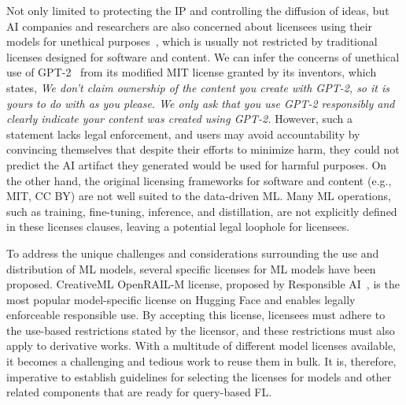 Not only limited to protecting the IP and controlling the diffusion of ideas, but AI companies and researchers are also concerned about licensees using their models for unethical purposes~\cite{jobin2019global, awad2018moral, yuste2017four}, which is usually not restricted by traditional licenses designed for software and content.
We can infer the concerns of unethical use of GPT-2~\cite{radford2019language} from its modified MIT license granted by its inventors, which states, \textit{We don't claim ownership of the content you create with GPT-2, so it is yours to do with as you please. We only ask that you use GPT-2 responsibly and clearly indicate your content was created using GPT-2.} 
However, such a statement lacks legal enforcement, and users may avoid accountability by convincing themselves that despite their efforts to minimize harm, they could not predict the AI artifact they generated would be used for harmful purposes.
On the other hand, the original licensing frameworks for software and content (e.g., MIT, CC BY) are not well suited to the data-driven ML. 
Many ML operations, such as training, fine-tuning, inference, and distillation, are not explicitly defined in these licenses clauses, leaving a potential legal loophole for licensees.

To address the unique challenges and considerations surrounding the use and distribution of ML models, several specific licenses for ML models have been proposed. 
CreativeML OpenRAIL-M license, proposed by Responsible AI~\cite{contractor2022behavioral}, is the most popular model-specific license on Hugging Face and enables legally enforceable responsible use.
By accepting this license, licensees must adhere to the use-based restrictions stated by the licensor, and these restrictions must also apply to derivative works.
With a multitude of different model licenses available, it becomes a challenging and tedious work to reuse them in bulk. 
It is, therefore, imperative to establish guidelines for selecting the licenses for models and other related components that are ready for query-based FL.



